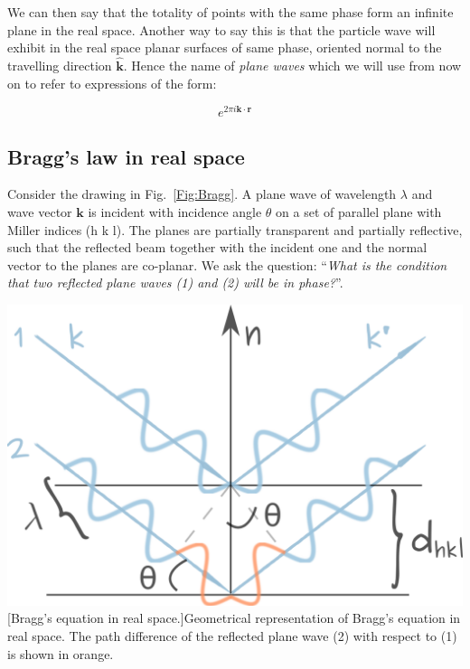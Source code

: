 \vspace*{0.3cm}

We can then say that the totality of points with the same phase form an infinite plane in the real space. Another way to say this is that the particle wave will exhibit in the real space planar surfaces of same phase, oriented normal to the travelling direction $\mathbf{\hat{k}}$. Hence the name of \textit{plane waves} which we will use from now on to refer to expressions of the form:

\begin{equation}
e^{2 \pi i  \mathbf{k} \cdot \mathbf{r}}
\end{equation}






\subsection{Bragg's law in real space}
\label{Sec:Bragg}

\begin{minipage}{0.5\textwidth}
Consider the drawing in Fig.~\ref{Fig:Bragg}. A plane wave of wavelength $\lambda$ and wave vector $\mathbf{k}$ is incident with incidence angle $\theta$ on a set of parallel plane with Miller indices \hkl(h k l). The planes are partially transparent and partially reflective, such that the reflected beam together with the incident one and the normal vector to the planes are co-planar. We ask the question: ``\textit{What is the condition that two reflected plane waves (1) and (2) will be in phase?}''. 
\end{minipage}
\begin{minipage}{0.5\textwidth}
    \centering
\captionsetup{width=.7\linewidth}
\includegraphics[width=0.8\linewidth]{Figures/Bragg.png}
[Bragg's equation in real space.]{Geometrical representation of Bragg's equation in real space. The path difference of the reflected plane wave (2) with respect to (1) is shown in orange.}
\label{Fig:Bragg}
\end{minipage}

